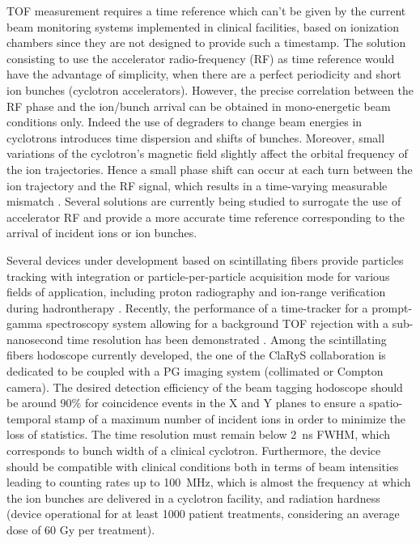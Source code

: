 \documentclass[a4paper,11pt]{article}
\begin{document}
TOF measurement requires a time reference which can't be given by the current beam monitoring systems implemented in clinical facilities, based on ionization chambers \cite{Stelzer2002} since they are not designed to provide such a timestamp. The solution consisting to use the accelerator radio-frequency (RF) as time reference would have the advantage of simplicity, when there are a perfect periodicity and short ion bunches (cyclotron accelerators). However, the precise correlation between the RF phase and the ion/bunch arrival can be obtained in mono-energetic beam conditions only. Indeed the use of degraders to change beam energies in cyclotrons introduces time dispersion and shifts of bunches. Moreover, small variations of the cyclotron’s magnetic field slightly affect the orbital frequency of the ion trajectories. Hence a small phase shift can occur at each turn between the ion trajectory and the RF signal, which results in a time-varying measurable mismatch \cite{Petzoldt2016}. Several solutions are currently being studied to surrogate the use of accelerator RF and provide a more accurate time reference corresponding to the arrival of incident ions or ion bunches.

Several devices under development based on scintillating fibers provide particles tracking with integration \cite{Leverington2018} or particle-per-particle \cite{Horikawa2004, Achenbach2008, Braccini2012} acquisition mode for various fields of application, including proton radiography \cite{Presti2016} and ion-range verification during hadrontherapy \cite{PAPA2016}. Recently, the performance of a time-tracker for a prompt-gamma spectroscopy system allowing for a background TOF rejection with a sub-nanosecond time resolution has been demonstrated \cite{Martins2020}. Among the scintillating fibers hodoscope currently developed, the one of the ClaRyS collaboration is dedicated to be coupled with a PG imaging system (collimated or Compton camera). The desired detection efficiency of the beam tagging hodoscope should be around 90\% for coincidence events in the X and Y planes to ensure a spatio-temporal stamp of a maximum number of incident ions in order to minimize the loss of statistics. The time resolution must remain below 2~ns FWHM, which corresponds to bunch width of a clinical cyclotron. Furthermore, the device should be compatible with clinical conditions both in terms of beam intensities leading to counting rates up to 100~MHz, which is almost the frequency at which the ion bunches are delivered in a cyclotron facility, and radiation hardness (device operational for at least 1000 patient treatments, considering an average dose of 60 Gy per treatment).
\end{document}
